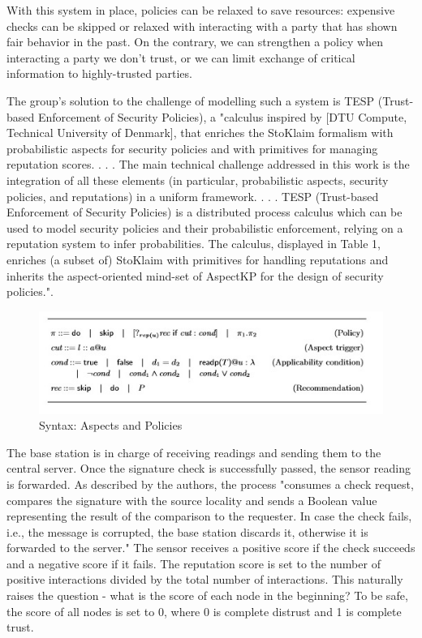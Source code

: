 \documentclass[12pt,a4paper,twoside]{report}
\begin{document}
With this system in place, policies can be relaxed to save resources: expensive checks can be skipped or relaxed with interacting with a party that has shown fair behavior in the past. On the contrary, we can strengthen a policy when interacting a party we don't trust, or we can limit exchange of critical information to highly-trusted parties. \par
The group's solution to the challenge of modelling such a system is TESP (Trust-based Enforcement of Security Policies), a "calculus inspired by [DTU Compute, Technical University of Denmark], that enriches the StoKlaim \cite{sen:2009} formalism with probabilistic aspects for security policies and with primitives for managing reputation scores. . . . The main technical challenge addressed in this work is the integration of all these elements (in particular, probabilistic aspects, security policies, and reputations) in a uniform framework. . . . TESP (Trust-based Enforcement of Security Policies) is a distributed process calculus which can be used to model security policies and their probabilistic enforcement, relying on a reputation system to infer probabilities. The calculus, displayed in Table 1, enriches (a subset of) StoKlaim with primitives for handling reputations and inherits the aspect-oriented mind-set of AspectKP for the design of security policies."\cite{vigo;etal:2014}.\par
\begin{figure}[ht]
	\begin{center}
  \includegraphics[width=1.0\textwidth,natwidth=501,natheight=173]{./figures/figure-03.jpg}
  \end{center}
  \caption{Syntax: Aspects and Policies \cite{vigo;etal:2014}}
  \label{fig:label}
\end{figure}
The base station is in charge of receiving readings and sending them to the central server. Once the signature check is successfully passed, the sensor reading is forwarded. As described by the authors, the process "consumes a check request, compares the signature with the source locality and sends a Boolean value representing the result of the comparison to the requester. In case the check fails, i.e., the message is corrupted, the base station discards it, otherwise it is forwarded to the server." The sensor receives a positive score if the check succeeds and a negative score if it fails. The reputation score is set to the number of positive interactions divided by the total number of interactions. This naturally raises the question - what is the score of each node in the beginning? To be safe, the score of all nodes is set to 0, where 0 is complete distrust and 1 is complete trust. \par
\end{document}
